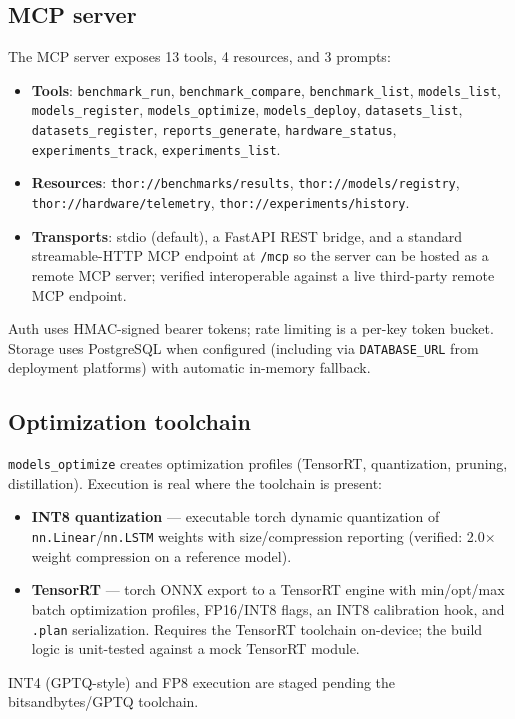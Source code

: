 \documentclass[11pt]{article}
\begin{document}
\subsection{MCP server}
The MCP server exposes 13 tools, 4 resources, and 3 prompts:
\begin{itemize}
  \item \textbf{Tools}: \texttt{benchmark\_run},
        \texttt{benchmark\_compare}, \texttt{benchmark\_list},
        \texttt{models\_list}, \texttt{models\_register},
        \texttt{models\_optimize}, \texttt{models\_deploy},
        \texttt{datasets\_list}, \texttt{datasets\_register},
        \texttt{reports\_generate}, \texttt{hardware\_status},
        \texttt{experiments\_track}, \texttt{experiments\_list}.
  \item \textbf{Resources}: \texttt{thor://benchmarks/results},
        \texttt{thor://models/registry},
        \texttt{thor://hardware/telemetry},
        \texttt{thor://experiments/history}.
  \item \textbf{Transports}: stdio (default), a FastAPI REST bridge,
        and a standard streamable-HTTP MCP endpoint at
        \texttt{/mcp} so the server can be hosted as a remote MCP
        server; verified interoperable against a live third-party
        remote MCP endpoint.
\end{itemize}
Auth uses HMAC-signed bearer tokens; rate limiting is a per-key token
bucket. Storage uses PostgreSQL when configured (including via
\texttt{DATABASE\_URL} from deployment platforms) with automatic
in-memory fallback.

\subsection{Optimization toolchain}
\texttt{models\_optimize} creates optimization profiles (TensorRT,
quantization, pruning, distillation). Execution is real where the
toolchain is present:
\begin{itemize}
  \item \textbf{INT8 quantization} --- executable torch dynamic
        quantization of \texttt{nn.Linear}/\texttt{nn.LSTM} weights
        with size/compression reporting (verified: 2.0$\times$ weight
        compression on a reference model).
  \item \textbf{TensorRT} --- torch ONNX export to a TensorRT engine
        with min/opt/max batch optimization profiles, FP16/INT8
        flags, an INT8 calibration hook, and \texttt{.plan}
        serialization. Requires the TensorRT toolchain on-device; the
        build logic is unit-tested against a mock TensorRT module.
\end{itemize}
INT4 (GPTQ-style) and FP8 execution are staged pending the
bitsandbytes/GPTQ toolchain.
\end{document}
